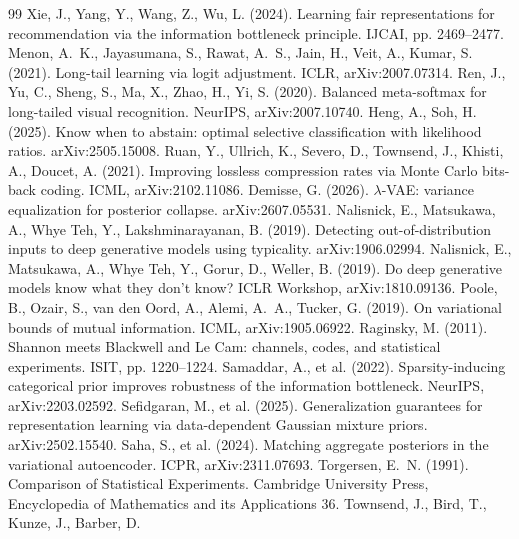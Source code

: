\documentclass[11pt]{article}
\begin{document}
\begin{thebibliography}{99}
 Xie, J., Yang, Y., Wang, Z., Wu, L. (2024). Learning
fair representations for recommendation via the information bottleneck principle. IJCAI,
pp. 2469--2477.
 Menon, A.~K., Jayasumana, S., Rawat, A.~S., Jain, H.,
Veit, A., Kumar, S. (2021). Long-tail learning via logit adjustment. ICLR, arXiv:2007.07314.
 Ren, J., Yu, C., Sheng, S., Ma, X., Zhao, H., Yi, S.
(2020). Balanced meta-softmax for long-tailed visual recognition. NeurIPS, arXiv:2007.10740.
 Heng, A., Soh, H. (2025). Know when to abstain:
optimal selective classification with likelihood ratios. arXiv:2505.15008.
 Ruan, Y., Ullrich, K., Severo, D., Townsend, J.,
Khisti, A., Doucet, A. (2021). Improving lossless compression rates via Monte Carlo bits-back
coding. ICML, arXiv:2102.11086.
 Demisse, G. (2026). $\lambda$-VAE: variance equalization
for posterior collapse. arXiv:2607.05531.
 Nalisnick, E., Matsukawa, A., Whye Teh, Y.,
Lakshminarayanan, B. (2019). Detecting out-of-distribution inputs to deep generative models using
typicality. arXiv:1906.02994.
 Nalisnick, E., Matsukawa, A., Whye Teh, Y.,
Gorur, D., Weller, B. (2019). Do deep generative models know what they don't know? ICLR Workshop,
arXiv:1810.09136.
 Poole, B., Ozair, S., van den Oord, A., Alemi, A.~A.,
Tucker, G. (2019). On variational bounds of mutual information. ICML, arXiv:1905.06922.
 Raginsky, M. (2011). Shannon meets Blackwell and Le Cam:
channels, codes, and statistical experiments. ISIT, pp. 1220--1224.
 Samaddar, A., et al. (2022). Sparsity-inducing
categorical prior improves robustness of the information bottleneck. NeurIPS, arXiv:2203.02592.
 Sefidgaran, M., et al. (2025). Generalization
guarantees for representation learning via data-dependent Gaussian mixture priors.
arXiv:2502.15540.
 Saha, S., et al. (2024). Matching aggregate posteriors in
the variational autoencoder. ICPR, arXiv:2311.07693.
 Torgersen, E.~N. (1991). Comparison of Statistical
Experiments. Cambridge University Press, Encyclopedia of Mathematics and its Applications 36.
 Townsend, J., Bird, T., Kunze, J., Barber, D.

\end{thebibliography}
\end{document}

